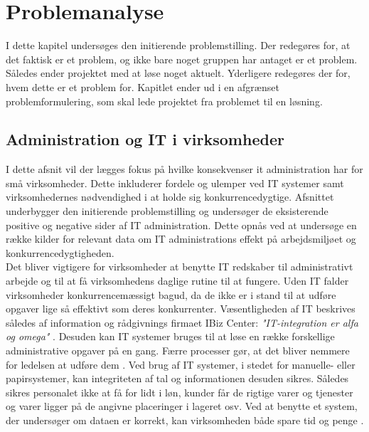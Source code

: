 \chapter{Problemanalyse}\label{ch:analyse}
I dette kapitel undersøges den initierende problemstilling. Der redegøres for, at det faktisk er et problem, og ikke bare noget gruppen har antaget er et problem. Således ender projektet med at løse noget aktuelt. Yderligere redegøres der for, hvem dette er et problem for. Kapitlet ender ud i en afgrænset problemformulering, som skal lede projektet fra problemet til en løsning.

\section{Administration og IT i virksomheder}
I dette afsnit vil der lægges fokus på hvilke konsekvenser it administration har for små virksomheder. Dette inkluderer fordele og ulemper ved IT systemer samt virksomhedernes nødvendighed i at holde sig konkurrencedygtige. Afsnittet underbygger den initierende problemstilling og undersøger de eksisterende positive og negative sider af IT administration. Dette opnås ved at undersøge en række kilder for relevant data om IT administrations effekt på arbejdsmiljøet og konkurrencedygtigheden.\\

Det bliver vigtigere for virksomheder at benytte IT redskaber til administrativt arbejde og til at få virksomhedens daglige rutine til at fungere. Uden IT falder virksomheder konkurrencemæssigt bagud, da de ikke er i stand til at udføre opgaver lige så effektivt som deres konkurrenter. Væsentligheden af IT beskrives således af information og rådgivnings firmaet IBiz Center: \textit{"IT-integration er alfa og omega"} \citep{case_green_team}. Desuden kan IT systemer bruges til at løse en række forskellige administrative opgaver på en gang. Færre processer gør, at det bliver nemmere for ledelsen at udføre dem \citep{Ibiz_streamline}. Ved brug af IT systemer, i stedet for manuelle- eller papirsystemer, kan integriteten af tal og informationen desuden sikres. Således sikres personalet ikke at få for lidt i løn, kunder får de rigtige varer og tjenester og varer ligger på de angivne placeringer i lageret osv. \citep{Ibiz_streamline} Ved at benytte et system, der undersøger om dataen er korrekt, kan virksomheden både spare tid og penge \citep{case_green_team}. 

\newpage
